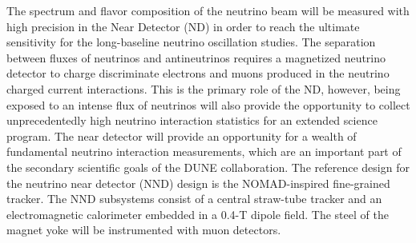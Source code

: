 The spectrum and flavor composition of the neutrino beam will be
measured with high precision in the Near Detector (ND) in order to
reach the ultimate sensitivity for the long-baseline neutrino
oscillation studies.  The separation between fluxes of neutrinos and
antineutrinos requires a magnetized neutrino detector to charge
discriminate electrons and muons produced in the neutrino charged
current interactions.  This is the primary role of the ND, however,
being exposed to an intense flux of neutrinos will also provide the
opportunity to collect unprecedentedly high neutrino
interaction statistics for an extended science program.  The near detector will
provide an opportunity for a wealth of fundamental neutrino
interaction measurements, which are an important part of the secondary
scientific goals of the DUNE collaboration.  The reference design for
the neutrino near detector (NND) design is the NOMAD-inspired
fine-grained tracker. The NND subsystems consist of a central
straw-tube tracker and an electromagnetic calorimeter embedded in a
0.4-T dipole field. The steel of the magnet yoke will be instrumented
with muon detectors.

